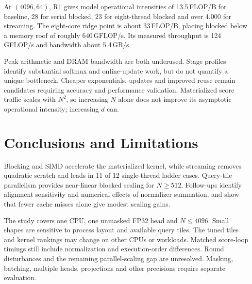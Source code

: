 \documentclass[11pt,a4paper]{article}
\begin{document}
At $(4096,64)$, R1 gives model operational intensities of 13.5\,FLOP/B
for baseline, 28 for serial blocked, 23 for eight-thread blocked and over
4,000 for streaming. The eight-core ridge point is about 33\,FLOP/B, placing
blocked below a memory roof of roughly 640\,GFLOP/s. Its measured throughput
is 124\,GFLOP/s and bandwidth about 5.4\,GB/s.

Peak arithmetic and DRAM bandwidth are both underused. Stage profiles
identify substantial softmax and online-update work, but do not quantify a
unique bottleneck. Cheaper exponentials, updates and improved reuse remain
candidates requiring accuracy and performance validation. Materialized score
traffic scales with $N^2$, so increasing $N$ alone does not improve its
asymptotic operational intensity; increasing $d$ can.











\section{Conclusions and Limitations}
Blocking and SIMD accelerate the materialized kernel, while streaming removes
quadratic scratch and leads in 11 of 12 single-thread ladder cases.
Query-tile parallelism provides near-linear blocked scaling for $N\ge512$.
Follow-ups identify alignment sensitivity and numerical effects of normalizer
summation, and show that fewer cache misses alone give modest scaling gains.

The study covers one CPU, one unmasked FP32 head and $N\le4096$.
Small shapes are sensitive to process layout and available query tiles.
The tuned tiles and kernel rankings may change on other CPUs or workloads.
Matched score-loop timings still include normalization and execution-order
differences. Round disturbances and the remaining parallel-scaling gap are
unresolved. Masking, batching, multiple heads, projections and other precisions
require separate evaluation.
\end{document}
